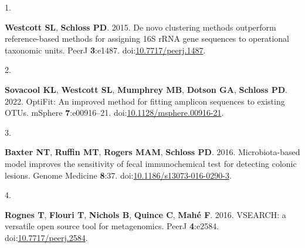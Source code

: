 \documentclass[
]{article}
\newlength{\cslhangindent}
\newlength{\csllabelwidth}
\newlength{\cslentryspacingunit} %
\newenvironment{CSLReferences}[2] %
 {%
  \setlength{\parindent}{0pt}
  \ifodd #1
  \let\oldpar\par
  \def\par{\hangindent=\cslhangindent\oldpar}
  \fi
  \setlength{\parskip}{#2\cslentryspacingunit}
 }%
 {}
\newcommand{\CSLLeftMargin}[1]{\parbox[t]{\csllabelwidth}{#1}}
\newcommand{\CSLRightInline}[1]{\parbox[t]{\linewidth - \csllabelwidth}{#1}\break}
\begin{document}
\hypertarget{refs}{}
\begin{CSLReferences}{0}{1}
\leavevmode{}%
\CSLLeftMargin{1. }%
\CSLRightInline{\textbf{Westcott SL}, \textbf{Schloss PD}. 2015. De novo
clustering methods outperform reference-based methods for assigning 16S
rRNA gene sequences to operational taxonomic units. PeerJ
\textbf{3}:e1487.
doi:\href{https://doi.org/10.7717/peerj.1487}{10.7717/peerj.1487}.}

\leavevmode{}%
\CSLLeftMargin{2. }%
\CSLRightInline{\textbf{Sovacool KL}, \textbf{Westcott SL},
\textbf{Mumphrey MB}, \textbf{Dotson GA}, \textbf{Schloss PD}. 2022.
OptiFit: An improved method for fitting amplicon sequences to existing
OTUs. mSphere \textbf{7}:e00916--21.
doi:\href{https://doi.org/10.1128/msphere.00916-21}{10.1128/msphere.00916-21}.}

\leavevmode{}%
\CSLLeftMargin{3. }%
\CSLRightInline{\textbf{Baxter NT}, \textbf{Ruffin MT}, \textbf{Rogers
MAM}, \textbf{Schloss PD}. 2016. Microbiota-based model improves the
sensitivity of fecal immunochemical test for detecting colonic lesions.
Genome Medicine \textbf{8}:37.
doi:\href{https://doi.org/10.1186/s13073-016-0290-3}{10.1186/s13073-016-0290-3}.}

\leavevmode{}%
\CSLLeftMargin{4. }%
\CSLRightInline{\textbf{Rognes T}, \textbf{Flouri T}, \textbf{Nichols
B}, \textbf{Quince C}, \textbf{Mahé F}. 2016. VSEARCH: a versatile open
source tool for metagenomics. PeerJ \textbf{4}:e2584.
doi:\href{https://doi.org/10.7717/peerj.2584}{10.7717/peerj.2584}.}


\end{CSLReferences}
\end{document}
